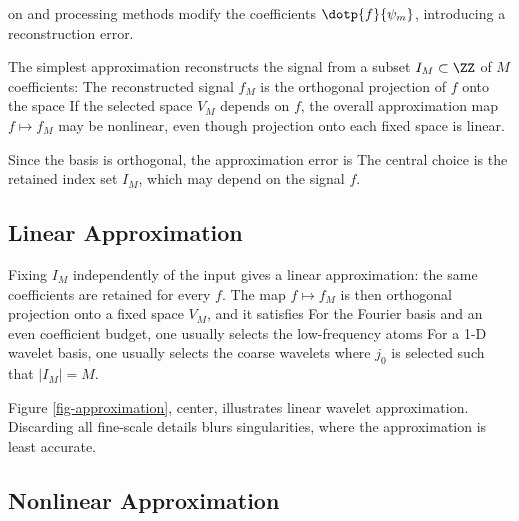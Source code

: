 on and processing methods modify the coefficients $\dotp{f}{\psi_m}$, introducing a reconstruction error.

The simplest approximation reconstructs the signal from a subset $I_M \subset \ZZ$ of $M$ coefficients:
The reconstructed signal $f_M$ is the orthogonal projection of $f$ onto the space
If the selected space $V_M$ depends on $f$, the overall approximation map $f \mapsto f_M$ may be nonlinear, even though projection onto each fixed space is linear.

Since the basis is orthogonal, the approximation error is 
The central choice is the retained index set $I_M$, which may depend on the signal $f$.

                                           
\subsection{Linear Approximation}

Fixing $I_M$ independently of the input gives a linear approximation: the same coefficients are retained for every $f$. The map $f \mapsto f_M$ is then orthogonal projection onto a fixed space $V_M$, and it satisfies
For the Fourier basis and an even coefficient budget, one usually selects the low-frequency atoms
For a 1-D wavelet basis, one usually selects the coarse wavelets
where $j_0$ is selected such that $|I_M|=M$.


Figure \ref{fig-approximation}, center, illustrates linear wavelet approximation. Discarding all fine-scale details blurs singularities, where the approximation is least accurate.

                                           
\subsection{Nonlinear Approximation}

